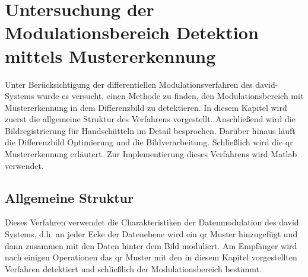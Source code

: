 \chapter{Untersuchung der Modulationsbereich Detektion mittels Mustererkennung } 


Unter Berücksichtigung der differentiellen Modulationsverfahren des \gls{david}-Systems wurde es versucht, einen Methode zu finden, den Modulationsbereich mit Mustererkennung in dem Differenzbild zu detektieren. In diesem Kapitel wird zuerst die allgemeine Struktur des Verfahrens vorgestellt. Anschließend wird die Bildregistrierung für Handschütteln im Detail besprochen. Darüber hinaus läuft die Differenzbild Optimierung und die Bildverarbeitung. Schließlich wird die \gls{qr} Mustererkennung erläutert. Zur Implementierung dieses Verfahrens wird Matlab verwendet.

\section{Allgemeine Struktur} 

Dieses Verfahren verwendet die Charakteristiken der Datenmodulation des \gls{david} Systems, d.h. an jeder Ecke der Datenebene wird ein \gls{qr} Muster hinzugefügt und dann zusammen mit den Daten hinter dem Bild moduliert. Am Empfänger wird nach einigen Operationen das \gls{qr} Muster mit den in diesem Kapitel vorgestellten Verfahren detektiert und schließlich der Modulationsbereich bestimmt. %



